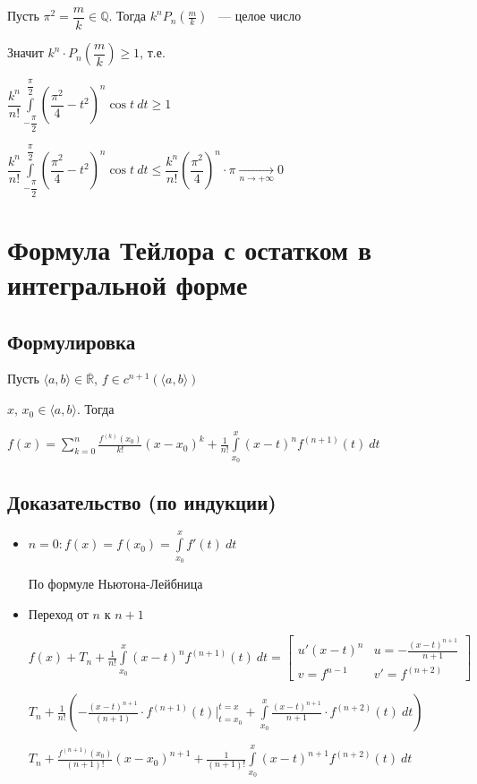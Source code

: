 \documentclass{article}
\begin{document}
			Пусть $\pi^2 = \dfrac{m}{k} \in \mathbb{Q}$. Тогда $k^n P_n\left(\frac{m}{k}\right)$ ~--- целое число
			
			Значит $k^n \cdot P_n \left(\dfrac{m}{k}\right) \geq 1$, т.е.
			
			$\dfrac{k^n}{n!} \int\limits^{\dfrac{\pi}{2}}_{-\dfrac{\pi}{2}} \left(\dfrac{\pi^2}{4} - t^2\right)^n \cos t \ dt \geq 1$
			
			$\dfrac{k^n}{n!} \int\limits^{\dfrac{\pi}{2}}_{-\dfrac{\pi}{2}} \left(\dfrac{\pi^2}{4} - t^2\right)^n \cos t \ dt \leq \dfrac{k^n}{n!} \left(\dfrac{\pi^2}{4}\right)^n \cdot \pi \xrightarrow[n \rightarrow +\infty]{} 0$
			
	\newpage
	
	\newpage

	\section{Формула Тейлора с остатком в интегральной форме}


		\subsection{Формулировка}

			Пусть $\langle a, b \rangle \in \overline{\mathbb{R}}$, $f \in c^{n + 1} (\langle a, b \rangle)$

			$x$, $x_0 \in \langle a, b \rangle$. Тогда

			$f(x) = \sum\limits^n_{k = 0} \frac{f^{(k)} (x_0)}{k!} (x - x_0)^k + \frac{1}{n!} \int\limits^x_{x_0} (x - t)^n f^{(n + 1)}(t) \ dt$

		\subsection{Доказательство (по индукции)}

			\begin{itemize}

				\item $n = 0 : f(x) = f(x_0) = \int\limits^x_{x_0} f'(t) \ dt$

					По формуле Ньютона-Лейбница

				\item Переход от $n$ к $n + 1$

					$f(x) + T_n + \frac{1}{n!} \int\limits^x_{x_0} (x - t)^n f^{(n + 1)} (t) \ dt = \begin{bmatrix} u' (x - t)^n & u = -\frac{(x - t)^{n + 1}}{n + 1} \\ v = f^{n - 1} & v' = f^{(n + 2)} \end{bmatrix}$
						
					$T_n + \frac{1}{n!} \left( -\frac{(x - t)^{n + 1}}{(n + 1)} \cdot f^{(n + 1)} (t) \bigg|^{t = x}_{t = x_0} + \int\limits^x_{x_0} \frac{(x - t)^{n + 1}}{n + 1} \cdot f^{(n + 2)} (t) \ dt \right)$ 
					
					$T_n + \frac{f^{(n + 1)} (x_0)}{(n + 1)!} (x - x_0)^{n + 1} + \frac{1}{(n + 1)!} \int\limits^x_{x_0} (x - t)^{n + 1} f^{(n + 2)} (t) \ dt$

			\end{itemize}
\end{document}
